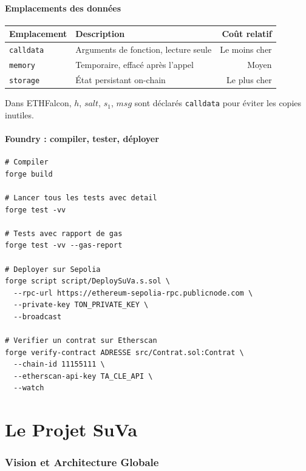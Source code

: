 \documentclass[11pt,a4paper]{article}
\begin{document}
\subsection{Emplacements des données}

\begin{center}
\begin{tabular}{llr}
\toprule
\textbf{Emplacement} & \textbf{Description} & \textbf{Coût relatif} \\
\midrule
\texttt{calldata} & Arguments de fonction, lecture seule & Le moins cher \\
\texttt{memory}   & Temporaire, effacé après l'appel & Moyen \\
\texttt{storage}  & État persistant on-chain & Le plus cher \\
\bottomrule
\end{tabular}
\end{center}

Dans ETHFalcon, $h$, $salt$, $s_1$, $msg$ sont déclarés \texttt{calldata} pour éviter les copies inutiles.

\subsection{Foundry : compiler, tester, déployer}

\begin{lstlisting}[style=bash]
# Compiler
forge build

# Lancer tous les tests avec detail
forge test -vv

# Tests avec rapport de gas
forge test -vv --gas-report

# Deployer sur Sepolia
forge script script/DeploySuVa.s.sol \
  --rpc-url https://ethereum-sepolia-rpc.publicnode.com \
  --private-key TON_PRIVATE_KEY \
  --broadcast

# Verifier un contrat sur Etherscan
forge verify-contract ADRESSE src/Contrat.sol:Contrat \
  --chain-id 11155111 \
  --etherscan-api-key TA_CLE_API \
  --watch
\end{lstlisting}

\newpage
\part{Le Projet SuVa}

\section{Vision et Architecture Globale}
\end{document}

